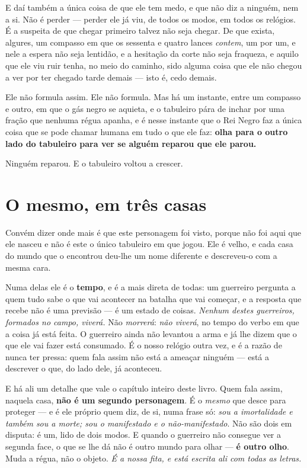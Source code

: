 \documentclass[livro.tex]{subfiles}
\begin{document}
E daí também a única coisa de que ele tem medo, e que não diz a ninguém, nem a si. Não é
perder --- perder ele já viu, de todos os modos, em todos os relógios. É a suspeita de que
chegar primeiro talvez não seja chegar. De que exista, algures, um compasso em que os
sessenta e quatro lances \emph{contem}, um por um, e nele a espera não seja lentidão, e a
hesitação da corte não seja fraqueza, e aquilo que ele viu ruir tenha, no meio do caminho,
sido alguma coisa que ele não chegou a ver por ter chegado tarde demais --- isto é, cedo
demais.

Ele não formula assim. Ele não formula. Mas há um instante, entre um compasso e outro, em
que o gás negro se aquieta, e o tabuleiro pára de inchar por uma fração que nenhuma régua
apanha, e é nesse instante que o Rei Negro faz a única coisa que se pode chamar humana em
tudo o que ele faz: \textbf{olha para o outro lado do tabuleiro para ver se alguém reparou
que ele parou.}

Ninguém reparou. E o tabuleiro voltou a crescer.

\section*{O mesmo, em três casas}

Convém dizer onde mais é que este personagem foi visto, porque não foi aqui que ele nasceu
e não é este o único tabuleiro em que jogou. Ele é velho, e cada casa do mundo que o
encontrou deu-lhe um nome diferente e descreveu-o com a mesma cara.

Numa delas ele é o \textbf{tempo}, e é a mais direta de todas: um guerreiro pergunta a quem
tudo sabe o que vai acontecer na batalha que vai começar, e a resposta que recebe não é uma
previsão --- é um estado de coisas. \emph{Nenhum destes guerreiros, formados no campo,
viverá.} Não \emph{morrerá}: \emph{não viverá}, no tempo do verbo em que a coisa já está
feita. O guerreiro ainda não levantou a arma e já lhe dizem que o que ele vai fazer está
consumado. É o nosso relógio outra vez, e é a razão de \Ven nunca ter pressa: quem fala
assim não está a ameaçar ninguém --- está a descrever o que, do lado dele, já aconteceu.

E há ali um detalhe que vale o capítulo inteiro deste livro. Quem fala assim, naquela casa,
\textbf{não é um segundo personagem}. É o \emph{mesmo} que desce para proteger --- e é ele
próprio quem diz, de si, numa frase só: \emph{sou a imortalidade e também sou a morte; sou o
manifestado e o não-manifestado}. Não são dois em disputa: é um, lido de dois modos. E quando
o guerreiro não consegue ver a segunda face, o que se lhe dá não é outro mundo para olhar ---
\textbf{é outro olho}. Muda a régua, não o objeto. \emph{É a nossa fita, e está escrita ali com
todas as letras.}
\end{document}
